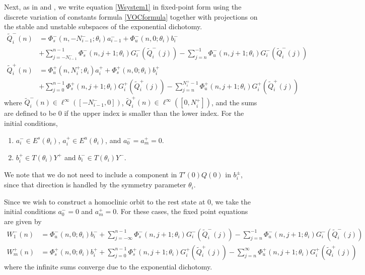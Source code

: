 \documentclass[12pt]{elsarticle}
\begin{document}
Next, as in \cite{Sandstede1997} and \cite{Knobloch2000}, we write equation \eqref{Wsystem1} in fixed-point form using the discrete variation of constants formula \eqref{VOCformula} together with projections on the stable and unstable subspaces of the exponential dichotomy.
\begin{equation}\label{FPeqs1}
\begin{aligned}
\tilde{Q}_i^-(n) &= 
\Phi_s^-(n, -N_{i-1}^-; \theta_i) a_{i-1}^- + \Phi_u^-(n, 0; \theta_i) b_i^-  \\
&+ \sum_{j = -N_{i-1}^-}^{n-1} \Phi_s^-(n, j+1; \theta_i) G_i^-(\tilde{Q}_i^-(j)) - \sum_{j = n}^{-1} \Phi_u^-(n, j+1; \theta_i) G_i^-(\tilde{Q}_i^-(j)) \\
\tilde{Q}_i^+(n) &= \Phi_u^+(n, N_i^+; \theta_i) a_i^+ + \Phi_s^+(n, 0; \theta_i) b_i^+ \\
&+ \sum_{j = 0}^{n-1} \Phi_s^+(n, j+1; \theta_i) G_i^+(\tilde{Q}_i^+(j)) 
- \sum_{j = n}^{N_i^+-1} \Phi_u^+(n, j+1; \theta_i) G_i^+(\tilde{Q}_i^+(j))
\end{aligned}
\end{equation}
where $\tilde{Q}_i^-(n) \in \ell^\infty([-N_{i-1}^-, 0])$, $\tilde{Q}_i^+(n) \in \ell^\infty([0, N_i^+])$, and the sums are defined to be $0$ if the upper index is smaller than the lower index. For the initial conditions, 
\begin{enumerate}
\item $a_i^- \in E^s(\theta_i)$, $a_i^+ \in E^u(\theta_i)$, and $a_0^- = a_m^+ = 0$.
\item $b_i^+ \in T(\theta_i) Y^+$ and $b_i^- \in T(\theta_i) Y^-$.
\end{enumerate}
We note that we do not need to include a component in $T'(0) Q(0)$ in $b_i^\pm$, since that direction is handled by the symmetry parameter $\theta_i$.

Since we wish to construct a homoclinic orbit to the rest state at 0, we take the initial conditions $a_0^- = 0$ and $a_m^+ = 0$. For these cases, the fixed point equations are given by
\begin{align*}
W_1^-(n) &= \Phi_u^-(n, 0; \theta_i) b_i^- 
+ \sum_{j = -\infty}^{n-1} \Phi_s^-(n, j+1; \theta_i) G_i^-(\tilde{Q}_i^-(j)) - \sum_{j = n}^{-1} \Phi_u^-(n, j+1; \theta_i) G_i^-(\tilde{Q}_i^-(j)) \\
W_m^+(n) &= \Phi_s^+(n, 0; \theta_i) b_i^+ 
+ \sum_{j = 0}^{n-1} \Phi_s^+(n, j+1; \theta_i) G_i^+(\tilde{Q}_i^+(j)) 
- \sum_{j = n}^\infty \Phi_u^+(n, j+1; \theta_i) G_i^+(\tilde{Q}_i^+(j))
\end{align*}
where the infinite sums converge due to the exponential dichotomy. 
\end{document}
